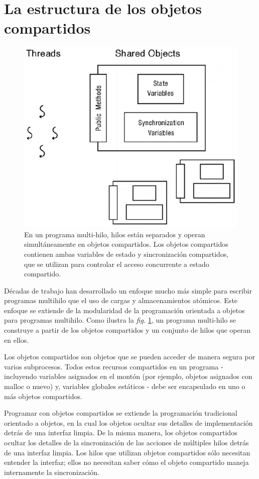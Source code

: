 \documentclass[10pt]{book}
\begin{document}
\section{La estructura de los objetos compartidos}
\begin{figure}[tbhp]
\centerline{\includegraphics[scale=0.45]{img/fig0501}}
\caption{En un programa multi-hilo, hilos están separados y operan simultáneamente en objetos compartidos. Los objetos compartidos contienen ambas variables de estado y sincronización compartidos, que se utilizan para controlar el acceso concurrente a estado compartido.}
\label{fig0501}
\end{figure}

Décadas de trabajo han desarrollado un enfoque mucho más simple para escribir programas multihilo que el uso de cargas y almacenamientos atómicos. Este enfoque se extiende de la modularidad de la programación orientada a objetos para programas multihilo. Como ilustra la \textit{fig.} \ref{fig0501}, un programa multi-hilo se construye a partir de los objetos compartidos y un conjunto de hilos que operan en ellos.

Los objetos compartidos son objetos que se pueden acceder de manera segura por varios subprocesos. Todos estos recursos compartidos en un programa - incluyendo variables asignados en el montón (por ejemplo, objetos asignados con malloc o nuevo) y, variables globales estáticos - debe ser encapsulado en uno o más objetos compartidos.

Programar con objetos compartidos se extiende la programación tradicional orientado a objetos, en la cual los objetos ocultar sus detalles de implementación detrás de una interfaz limpia. De la misma manera, los objetos compartidos ocultar los detalles de la sincronización de las acciones de múltiples hilos detrás de una interfaz limpia. Los hilos que utilizan objetos compartidos sólo necesitan entender la interfaz; ellos no necesitan saber cómo el objeto compartido maneja internamente la sincronización.
\end{document}
